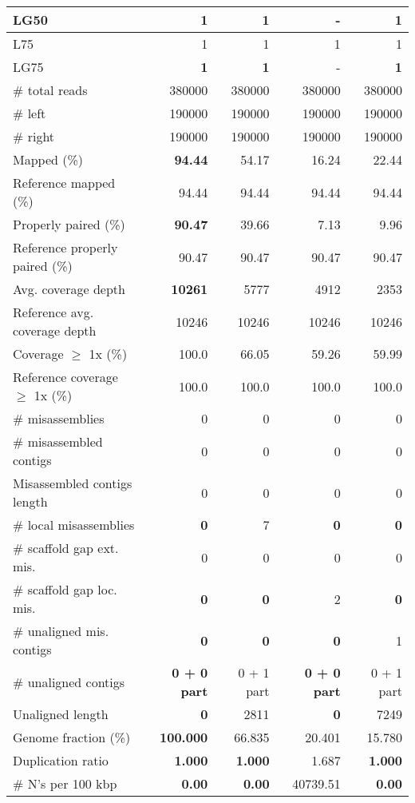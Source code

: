 \documentclass[12pt,a4paper]{article}
\begin{document}
\begin{table}[ht]
\begin{center}
\begin{tabular}{|l*{4}{|r}|}
LG50 & {\bf 1} & {\bf 1} & - & {\bf 1} \\ \hline
L75 & 1 & 1 & 1 & 1 \\ \hline
LG75 & {\bf 1} & {\bf 1} & - & {\bf 1} \\ \hline
\# total reads & 380000 & 380000 & 380000 & 380000 \\ \hline
\# left & 190000 & 190000 & 190000 & 190000 \\ \hline
\# right & 190000 & 190000 & 190000 & 190000 \\ \hline
Mapped (\%) & {\bf 94.44} & 54.17 & 16.24 & 22.44 \\ \hline
Reference mapped (\%) & 94.44 & 94.44 & 94.44 & 94.44 \\ \hline
Properly paired (\%) & {\bf 90.47} & 39.66 & 7.13 & 9.96 \\ \hline
Reference properly paired (\%) & 90.47 & 90.47 & 90.47 & 90.47 \\ \hline
Avg. coverage depth & {\bf 10261} & 5777 & 4912 & 2353 \\ \hline
Reference avg. coverage depth & 10246 & 10246 & 10246 & 10246 \\ \hline
Coverage $\geq$ 1x (\%) & 100.0 & 66.05 & 59.26 & 59.99 \\ \hline
Reference coverage $\geq$ 1x (\%) & 100.0 & 100.0 & 100.0 & 100.0 \\ \hline
\# misassemblies & 0 & 0 & 0 & 0 \\ \hline
\# misassembled contigs & 0 & 0 & 0 & 0 \\ \hline
Misassembled contigs length & 0 & 0 & 0 & 0 \\ \hline
\# local misassemblies & {\bf 0} & 7 & {\bf 0} & {\bf 0} \\ \hline
\# scaffold gap ext. mis. & 0 & 0 & 0 & 0 \\ \hline
\# scaffold gap loc. mis. & {\bf 0} & {\bf 0} & 2 & {\bf 0} \\ \hline
\# unaligned mis. contigs & {\bf 0} & {\bf 0} & {\bf 0} & 1 \\ \hline
\# unaligned contigs & {\bf 0 + 0 part} & 0 + 1 part & {\bf 0 + 0 part} & 0 + 1 part \\ \hline
Unaligned length & {\bf 0} & 2811 & {\bf 0} & 7249 \\ \hline
Genome fraction (\%) & {\bf 100.000} & 66.835 & 20.401 & 15.780 \\ \hline
Duplication ratio & {\bf 1.000} & {\bf 1.000} & 1.687 & {\bf 1.000} \\ \hline
\# N's per 100 kbp & {\bf 0.00} & {\bf 0.00} & 40739.51 & {\bf 0.00} \\ \hline

\end{tabular}
\end{center}
\end{table}
\end{document}
